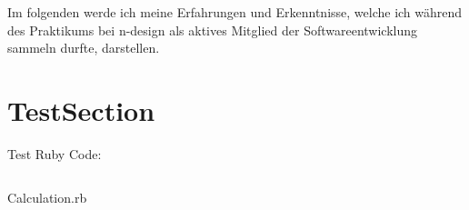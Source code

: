 \documentclass[11pt,a4paper,ngerman]{report}
\begin{document}
Im folgenden werde ich meine Erfahrungen und Erkenntnisse, welche ich während des Praktikums bei n-design als aktives Mitglied der Softwareentwicklung sammeln durfte, darstellen.

\section{TestSection}
Test Ruby Code:
\begin{listing}
    \inputminted{ruby}{/Users/pbz/Documents/Projects/hasher_api/app/models/calculation.rb}
    \caption{Calculation.rb}
    \label{lst:Calculation}
\end{listing}


\clearpage
{}
{}
\listoflistings
\clearpage
\end{document}
